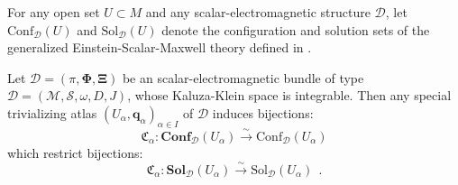 \documentclass[10pt, cmp, numbook, final, a4paper]{svjour}
\def\bcD{\boldsymbol{\mathcal{D}}}
\newcommand{\cM}{\mathcal{M}}
\def\cD{\mathcal{D}}
\def\bXi{{\boldsymbol{\Xi}}}
\def\cS{\mathcal{S}}
\def\bPhi{\mathbf{\Phi}}
\def\bConf{\mathbf{Conf}}
\def\bSol{\mathbf{Sol}}
\def\Sol{\mathrm{Sol}}
\def\Conf{\mathrm{Conf}}
\def\mq{\mathbf{q}}
\begin{document}
\noindent For any open set $U\subset M$ and any scalar-electromagnetic structure
$\cD$, let $\Conf_\cD(U)$ and $\Sol_\cD(U)$ denote the configuration
and solution sets of the generalized Einstein-Scalar-Maxwell theory
defined in \cite{GESM}.


\begin{theorem}
\label{thm:equivalence}
Let $\bcD = (\pi,\bPhi,\bXi)$ be an scalar-electromagnetic bundle of
type $\cD=(\cM,\cS,\omega,D,J)$, whose Kaluza-Klein space is
integrable. Then any special trivializing atlas
$(U_\alpha,\mq_\alpha)_{\alpha\in I}$ of $\bcD$ induces bijections:
\begin{equation*}
\mathfrak{C}_\alpha \colon \bConf_{\bcD}(U_{\alpha})\xrightarrow{\sim}  \Conf_{\cD}(U_{\alpha})
\end{equation*}
which restrict bijections:
\begin{equation*}
\mathfrak{C}_\alpha \colon \bSol_{\bcD}(U_{\alpha}) \xrightarrow{\sim} \Sol_{\cD}(U_{\alpha})~~.
\end{equation*}
\end{theorem}
\end{document}
